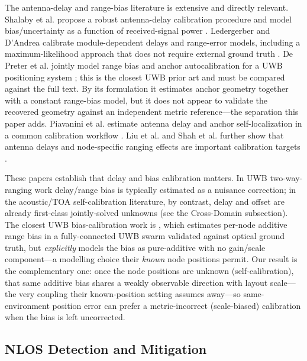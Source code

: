 \documentclass[11pt,a4paper]{article}
\begin{document}
The antenna-delay and range-bias literature is extensive and directly relevant. Shalaby et al. propose a robust antenna-delay calibration procedure and model bias/uncertainty as a function of received-signal power \citep{shalaby_2023_calibration_and_uncertainty_char}. Ledergerber and D'Andrea calibrate module-dependent delays and range-error models, including a maximum-likelihood approach that does not require external ground truth \citep{ledergerber_2018_calibrating_away_inaccuracies_uwb}. De Preter et al. jointly model range bias and anchor autocalibration for a UWB positioning system \citep{de_preter_2019_range_bias_modeling_autocalibration}; this is the closest UWB prior art and must be compared against the full text. By its formulation it estimates anchor geometry together with a constant range-bias model, but it does not appear to validate the recovered geometry against an independent metric reference---the separation this paper adds. Piavanini et al. estimate antenna delay and anchor self-localization in a common calibration workflow \citep{piavanini_2022_a_calibration_method_for}. Liu et al. and Shah et al. further show that antenna delays and node-specific ranging effects are important calibration targets \citep{liu_2024_data_driven_antenna_delay_calibr,shah_2021_antenna_delay_calibration_of,shah_2022_node_calibration_in_uwb_based}.

These papers establish that delay and bias calibration matters. In UWB two-way-ranging work delay/range bias is typically estimated as a nuisance correction; in the acoustic/TOA self-calibration literature, by contrast, delay and offset are already first-class jointly-solved unknowns (see the Cross-Domain subsection). The closest UWB bias-calibration work is \citet{yogesh_2024_novel_calibration}, which estimates per-node additive range bias in a fully-connected UWB swarm validated against optical ground truth, but \emph{explicitly} models the bias as pure-additive with no gain/scale component---a modelling choice their \emph{known} node positions permit. Our result is the complementary one: once the node positions are unknown (self-calibration), that same additive bias shares a weakly observable direction with layout scale---the very coupling their known-position setting assumes away---so same-environment position error can prefer a metric-incorrect (scale-biased) calibration when the bias is left uncorrected.

\subsection{NLOS Detection and Mitigation}
\end{document}
